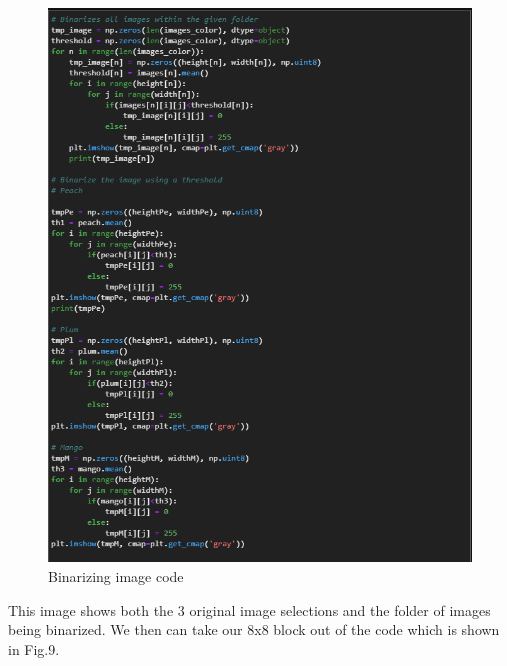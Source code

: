 \documentclass[conference]{IEEEtran}
\begin{document}
\begin{figure}[h]
  \centering
  \includegraphics[width=\linewidth]{Binarize_images.png}
  \caption{Binarizing image code}
\end{figure}

This image shows both the 3 original image selections and the folder of images being binarized. We then can take our 8x8 block out of the code which is shown in Fig.9.
\end{document}
